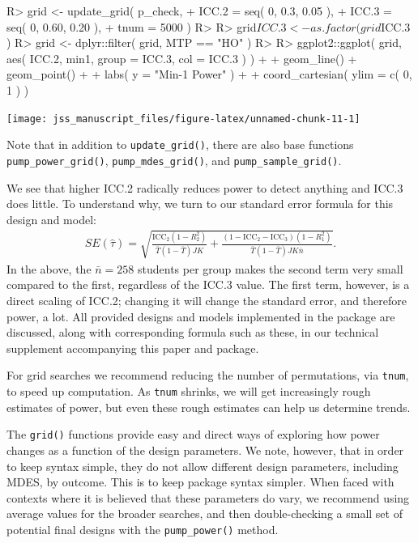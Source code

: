 \documentclass[
]{jss}
\begin{document}
\begin{CodeChunk}
\begin{CodeInput}
R> grid <- update_grid( p_check,
+           ICC.2 = seq( 0, 0.3, 0.05 ),
+           ICC.3 = seq( 0, 0.60, 0.20 ),
+           tnum = 5000 )
R> 
R> grid$ICC.3 <- as.factor( grid$ICC.3 )
R> grid <- dplyr::filter( grid, MTP == "HO" )
R> 
R> ggplot2::ggplot( grid, aes( ICC.2, min1, group = ICC.3, col = ICC.3 ) ) +
+   geom_line() + geom_point() +
+   labs( y = "Min-1 Power" ) +
+   coord_cartesian( ylim = c( 0, 1 ) )
\end{CodeInput}


\begin{center}\texttt{[image: jss\_manuscript\_files/figure-latex/unnamed-chunk-11-1]} \end{center}

\end{CodeChunk}

Note that in addition to \texttt{update\_grid()}, there are also base
functions \texttt{pump\_power\_grid()}, \texttt{pump\_mdes\_grid()}, and
\texttt{pump\_sample\_grid()}.

We see that higher ICC.2 radically reduces power to detect anything and
ICC.3 does little. To understand why, we turn to our standard error
formula for this design and model: \[
\begin{aligned}
SE( \hat{\tau} ) = \sqrt{
\frac{\text{ICC}_{2}(1 - R^2_{2})}{\bar{T}(1 - \bar{T}) JK} +
\frac{(1-\text{ICC}_{2} - \text{ICC}_{3})(1-R^2_{1})}{\bar{T}(1 - \bar{T}) J K\bar{n}} } .
\end{aligned}
\] In the above, the \(\bar{n} = 258\) students per group makes the
second term very small compared to the first, regardless of the ICC.3
value. The first term, however, is a direct scaling of ICC.2; changing
it will change the standard error, and therefore power, a lot. All
provided designs and models implemented in the package are discussed,
along with corresponding formula such as these, in our technical
supplement accompanying this paper and package.

For grid searches we recommend reducing the number of permutations, via
\texttt{tnum}, to speed up computation. As \texttt{tnum} shrinks, we
will get increasingly rough estimates of power, but even these rough
estimates can help us determine trends.

The \texttt{grid()} functions provide easy and direct ways of exploring
how power changes as a function of the design parameters. We note,
however, that in order to keep syntax simple, they do not allow
different design parameters, including MDES, by outcome. This is to keep
package syntax simpler. When faced with contexts where it is believed
that these parameters do vary, we recommend using average values for the
broader searches, and then double-checking a small set of potential
final designs with the \texttt{pump\_power()} method.
\end{document}
